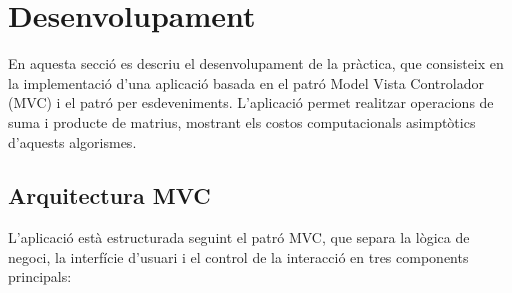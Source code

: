 \documentclass{ieeetj}
\begin{document}
\section{Desenvolupament}
En aquesta secció es descriu el desenvolupament de la pràctica, que consisteix en la implementació d'una aplicació basada en el patró Model Vista Controlador (MVC) i el patró per esdeveniments. L'aplicació permet realitzar operacions de suma i producte de matrius, mostrant els costos computacionals asimptòtics d'aquests algorismes.

\subsection{Arquitectura MVC}
L'aplicació està estructurada seguint el patró MVC, que separa la lògica de negoci, la interfície d'usuari i el control de la interacció en tres components principals:
\end{document}
